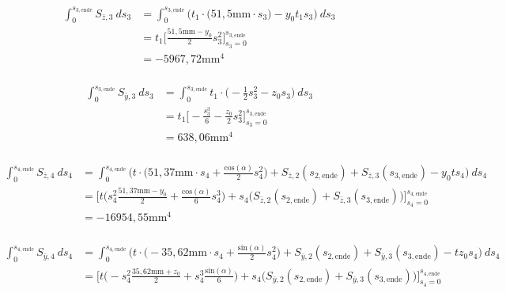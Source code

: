 \begin{itemize}
\begin{equation}
\begin{split}
			\int_{0}^{s_{3,\mathrm{ende}}} S_{\bar z,3}\ ds_3 &= \int_{0}^{s_{3,\mathrm{ende}}} \bigg(t_1\cdot\bigg(51,5\mathrm{mm}\cdot s_3\bigg) -y_0t_1s_3\bigg)\ ds_3\\\
			&=t_1\bigg[\frac{51,5\mathrm{mm}-y_0}{2}s_3^2\bigg]_{s_3=0}^{s_{3,\mathrm{ende}}}\\\
			&=-5967,72\mathrm{mm}^4
		\end{split}
	\end{equation}\\
	\begin{equation}
		\begin{split}
			\int_{0}^{s_{3,\mathrm{ende}}} S_{\bar y,3}\ ds_3 &= \int_{0}^{s_{3,\mathrm{ende}}} t_1\cdot\bigg(-\frac{1}{2}s^2_3-z_0s_3\bigg)\ ds_3\\\
			&=t_1\bigg[-\frac{s_3^3}{6}-\frac{z_0}{2}s_3^2\bigg]_{s_3=0}^{s_{3,\mathrm{ende}}}\\\
			&=638,06\mathrm{mm}^4
		\end{split}
	\end{equation}\\
	\begin{equation}
		\begin{split}
			\int_{0}^{s_{4,\mathrm{ende}}} S_{\bar z,4}\ ds_4 &= \int_{0}^{s_{4,\mathrm{ende}}} \bigg(t\cdot\bigg(51,37\mathrm{mm}\cdot s_4 + \frac{\mathrm{cos}(\alpha)}{2}s^2_4\bigg) + S_{\bar z,2}(s_{2,\mathrm{ende}})  + S_{\bar z,3}(s_{3,\mathrm{ende}})-y_0ts_4\bigg)\ ds_4\\\
			&= \bigg[t\bigg(s_4^2\frac{51,37\mathrm{mm}-y_0}{2}+\frac{\mathrm{cos}(\alpha)}{6}s_4^3\bigg)+s_4\bigg(S_{\bar z,2}(s_{2,\mathrm{ende}})  + S_{\bar z,3}(s_{3,\mathrm{ende}})\bigg)\bigg]_{s_4=0}^{s_{4,\mathrm{ende}}}\\\
			&=-16954,55\mathrm{mm}^4
		\end{split}
	\end{equation}\\
	\begin{equation}
		\begin{split}
			 \int_{0}^{s_{4,\mathrm{ende}}} S_{\bar y,4}\ ds_4 &= \int_{0}^{s_{4,\mathrm{ende}}} \bigg(t\cdot\bigg(-35,62\mathrm{mm}\cdot s_4 + \frac{\mathrm{sin}(\alpha)}{2}s^2_4\bigg) + S_{\bar y,2}(s_{2,\mathrm{ende}})  + S_{\bar y,3}(s_{3,\mathrm{ende}})-tz_0s_4\bigg)\ ds_4\\\
			 &=\bigg[t\bigg(-s_4^2\frac{35,62\mathrm{mm}+z_0}{2}+s_4^3\frac{\mathrm{sin}(\alpha)}{6}\bigg)+ s_4\bigg(S_{\bar y,2}(s_{2,\mathrm{ende}})  + S_{\bar y,3}(s_{3,\mathrm{ende}})\bigg)\bigg]_{s_4=0}^{s_{4,\mathrm{ende}}}\\\

\end{split}
\end{equation}
\end{itemize}
